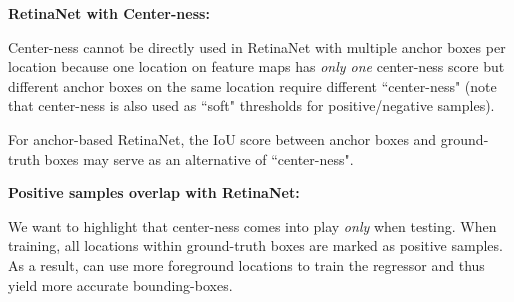\noindent\textbf{RetinaNet with Center-ness: %
}

 Center-ness cannot be directly used in RetinaNet with multiple anchor boxes per location because one location on feature maps has \textit{only one} center-ness score but different anchor boxes on the same location require different ``center-ness"
 (note that center-ness is also used as ``soft" thresholds for positive/negative samples).

  For anchor-based RetinaNet, the IoU score between anchor boxes and ground-truth boxes may serve as an alternative of ``center-ness".



\noindent\textbf{Positive samples overlap with RetinaNet:}

 We want to highlight that center-ness comes into play \textit{only} when testing. When training, all locations within ground-truth
  boxes are marked as positive samples. As a result, \Ours can use more foreground locations to train the regressor and thus yield more accurate bounding-boxes.


